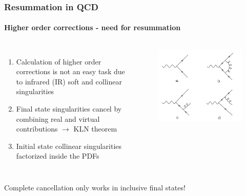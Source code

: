 \documentclass[aspectratio=43]{beamer}
\begin{document}
\begin{frame}

	\frametitle{Resummation in QCD}
	\framesubtitle{Higher order corrections - need for resummation}

	\footnotesize
	
	\begin{columns}
	
	
	\begin{enumerate}
		\item Calculation of higher order corrections is {\color{red}not an easy task} due to {\color{red} infrared (IR) soft and collinear singularities}
		\item Final state singularities {\color{blue}cancel} by combining real and virtual contributions $\longrightarrow$ KLN theorem
		\item Initial state collinear singularities {\color{blue}factorized} inside the PDFs
	\end{enumerate}
	
	\begin{figure}[!htb]
		\includegraphics[width = \linewidth]{plots/part2/qcd_corrections.png}
	\end{figure}
	
	\end{columns}

	\vspace{0.5 cm}
	
	Complete cancellation only works in inclusive final states!

\end{frame}
\end{document}
